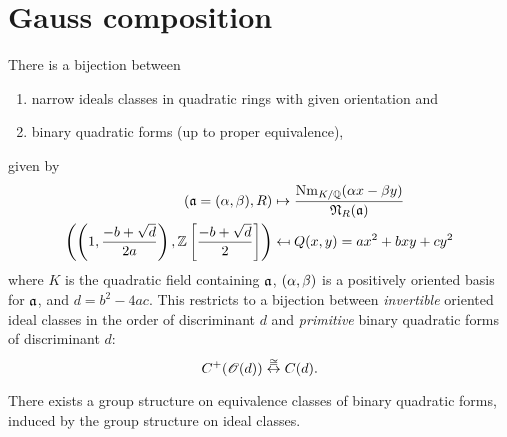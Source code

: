 \section{Gauss composition}
%
\begin{thm}
There is a bijection between
\begin{enumerate}
\item narrow ideals classes in quadratic rings with given orientation and
\item binary quadratic forms (up to proper equivalence),
\end{enumerate}
given by 
\begin{align*}
\left( {\mathfrak{a}=(\alpha,\beta),R} \right)&\mapsto \frac{\operatorname{Nm}_{K/\mathbb{Q}}(\alpha x-\beta y)}{\mathfrak N_R(\mathfrak{a})}\\
\left( {\left( {1,\frac{-b+\sqrt d}{2a}} \right),\mathbb{Z}\left[ {\frac{-b+\sqrt d}{2}} \right]} \right)&\mapsfrom Q(x,y)=ax^2+bxy+cy^2
\end{align*}
where $K$ is the quadratic field containing $\mathfrak{a}$, $(\alpha,\beta)$ is a positively oriented basis for $\mathfrak{a}$, and $d=b^2-4ac$.
This restricts to a bijection between {\it invertible} oriented ideal classes in the order of discriminant $d$ and {\it primitive} binary quadratic forms of discriminant $d$:
\[
C^+(\mathscr{O}(d))\overset{\cong}{\leftrightarrow} C(d).
\]
\end{thm}
\begin{cor}
There exists a group structure on equivalence classes of binary quadratic forms, induced by the group structure on ideal classes.
\end{cor}
